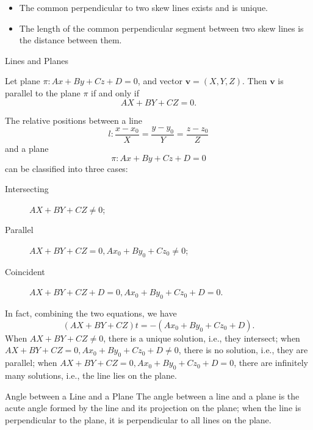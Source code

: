 \documentclass[11pt]{../../TexTemplate/elegantbook} %
\begin{document}
\begin{property}
    \begin{itemize}
        \item The common perpendicular to two skew lines exists and is unique.
        \item The length of the common perpendicular segment between two skew lines is the distance between them.
    \end{itemize}
\end{property}


\begin{leftbarTitle}{Lines and Planes}\end{leftbarTitle}
\begin{proposition}
    Let plane \(\pi: A x + B y + C z + D = 0\),
    and vector \(\mathbf{v} = (X, Y, Z)\).
    Then \(\mathbf{v}\) is parallel to the plane \(\pi\) if and only if
    \[
    AX + BY + CZ = 0.
    \]
\end{proposition}

The relative positions between a line 
\[
l: \frac{x-x_{0}}{X} = \frac{y-y_{0}}{Y} = \frac{z-z_{0}}{Z}
\] 
and a plane
\[
\pi: A x + B y + C z + D = 0
\]
can be classified into three cases:
\begin{description}
    \item[Intersecting] \(A X + B Y + C Z \neq 0\);
    \item[Parallel] \(A X + B Y + C Z = 0, A x_{0} + B y_{0} + C z_{0} \neq 0\);
    \item[Coincident] \(A X + B Y + C Z + D = 0, A x_{0} + B y_{0} + C z_{0} + D = 0\).
\end{description}

\begin{remark}
    In fact, combining the two equations, we have 
    \[
    (AX+BY+CZ)t=-(Ax_{0}+By_{0}+Cz_{0}+D).
    \]
    When \(AX+BY+CZ\ne0\), there is a unique solution, i.e., they intersect; \newline
    when \(AX+BY+CZ=0,Ax_{0}+By_{0}+Cz_{0}+D\ne0\), there is no solution, i.e., they are parallel; \newline
    when \(AX+BY+CZ=0,Ax_{0}+By_{0}+Cz_{0}+D=0\), there are infinitely many solutions, i.e., the line lies on the plane.
\end{remark}

\begin{definition}{Angle between a Line and a Plane}
    The angle between a line and a plane is the acute angle formed by the line and its projection on the plane; 
    when the line is perpendicular to the plane, it is perpendicular to all lines on the plane.
\end{definition}
\end{document}
